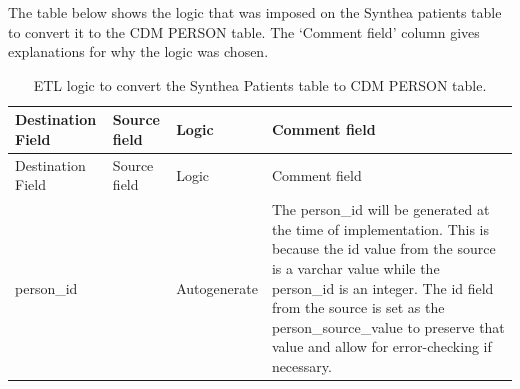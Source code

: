 \documentclass[11pt]{book}
\theoremstyle{definition}
\theoremstyle{definition}
\theoremstyle{definition}
\theoremstyle{remark}
\begin{document}
The table below shows the logic that was imposed on the Synthea patients table to convert it to the CDM PERSON table. The `Comment field' column gives explanations for why the logic was chosen.

\begin{longtable}[]{@{}llll@{}}
\caption{\label{tab:syntheaEtlPerson} ETL logic to convert the Synthea Patients table to CDM PERSON table.}\tabularnewline
\toprule
\begin{minipage}[b]{0.24\columnwidth}\raggedright
Destination Field\strut
\end{minipage} & \begin{minipage}[b]{0.10\columnwidth}\raggedright
Source field\strut
\end{minipage} & \begin{minipage}[b]{0.12\columnwidth}\raggedright
Logic\strut
\end{minipage} & \begin{minipage}[b]{0.42\columnwidth}\raggedright
Comment field\strut
\end{minipage}\tabularnewline
\midrule
\endfirsthead
\toprule
\begin{minipage}[b]{0.24\columnwidth}\raggedright
Destination Field\strut
\end{minipage} & \begin{minipage}[b]{0.10\columnwidth}\raggedright
Source field\strut
\end{minipage} & \begin{minipage}[b]{0.12\columnwidth}\raggedright
Logic\strut
\end{minipage} & \begin{minipage}[b]{0.42\columnwidth}\raggedright
Comment field\strut
\end{minipage}\tabularnewline
\midrule
\endhead
\begin{minipage}[t]{0.24\columnwidth}\raggedright
person\_id\strut
\end{minipage} & \begin{minipage}[t]{0.10\columnwidth}\raggedright
\strut
\end{minipage} & \begin{minipage}[t]{0.12\columnwidth}\raggedright
Autogenerate\strut
\end{minipage} & \begin{minipage}[t]{0.42\columnwidth}\raggedright
The person\_id will be generated at the time of implementation. This is because the id value from the source is a varchar value while the person\_id is an integer. The id field from the source is set as the person\_source\_value to preserve that value and allow for error-checking if necessary.\strut

\end{minipage}
\end{longtable}
\end{document}
